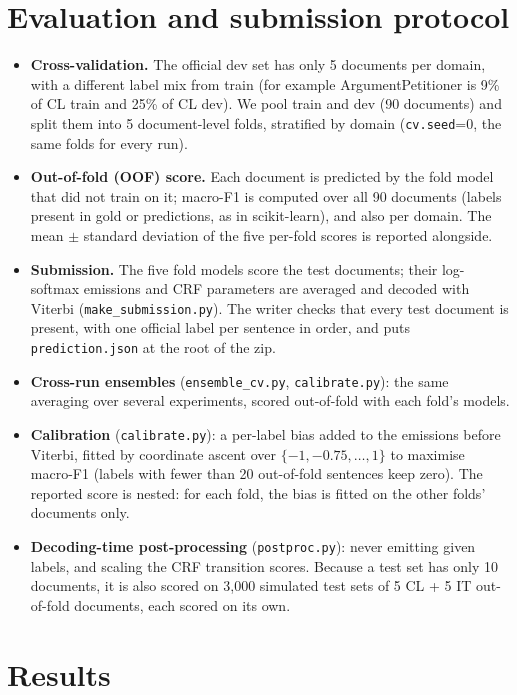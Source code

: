 \documentclass[11pt,a4paper]{article}
\newcommand{\code}[1]{\texttt{\small #1}}
\begin{document}
\section{Evaluation and submission protocol}\label{sec:protocol}
\begin{itemize}
  \item \textbf{Cross-validation.} The official dev set has only 5 documents per domain, with a different label
  mix from train (for example ArgumentPetitioner is 9\% of CL train and 25\% of CL dev).  We pool train and dev
  (90 documents) and split them into 5 document-level folds, stratified by domain (\code{cv.seed}=0, the same
  folds for every run).
  \item \textbf{Out-of-fold (OOF) score.} Each document is predicted by the fold model that did not train on it;
  macro-F1 is computed over all 90 documents (labels present in gold or predictions, as in scikit-learn), and
  also per domain.  The mean $\pm$ standard deviation of the five per-fold scores is reported alongside.
  \item \textbf{Submission.} The five fold models score the test documents; their log-softmax emissions and CRF
  parameters are averaged and decoded with Viterbi (\code{make\_submission.py}).  The writer checks that every
  test document is present, with one official label per sentence in order, and puts \code{prediction.json} at
  the root of the zip.
  \item \textbf{Cross-run ensembles} (\code{ensemble\_cv.py}, \code{calibrate.py}): the same averaging over
  several experiments, scored out-of-fold with each fold's models.
  \item \textbf{Calibration} (\code{calibrate.py}): a per-label bias added to the emissions before Viterbi,
  fitted by coordinate ascent over $\{-1,-0.75,\dots,1\}$ to maximise macro-F1 (labels with fewer than 20
  out-of-fold sentences keep zero).  The reported score is nested: for each fold, the bias is fitted on the
  other folds' documents only.
  \item \textbf{Decoding-time post-processing} (\code{postproc.py}): never emitting given labels, and scaling
  the CRF transition scores.  Because a test set has only 10 documents, it is also scored on 3{,}000 simulated
  test sets of 5 CL + 5 IT out-of-fold documents, each scored on its own.
\end{itemize}

\section{Results}
\end{document}
